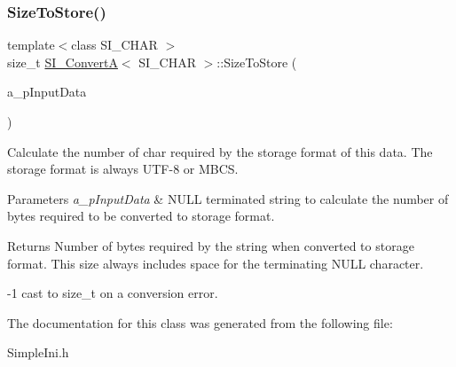 \subsubsection{\texorpdfstring{Size\+To\+Store()}{SizeToStore()}}
{\footnotesize\ttfamily template$<$class S\+I\+\_\+\+C\+H\+AR $>$ \\
size\+\_\+t \hyperlink{a00925}{S\+I\+\_\+\+ConvertA}$<$ S\+I\+\_\+\+C\+H\+AR $>$\+::Size\+To\+Store (\begin{DoxyParamCaption}\item[{const S\+I\+\_\+\+C\+H\+AR $\ast$}]{a\+\_\+p\+Input\+Data }\end{DoxyParamCaption})\hspace{0.3cm}{\ttfamily [inline]}}

Calculate the number of char required by the storage format of this data. The storage format is always U\+T\+F-\/8 or M\+B\+CS.


\begin{DoxyParams}{Parameters}
{\em a\+\_\+p\+Input\+Data} & N\+U\+LL terminated string to calculate the number of bytes required to be converted to storage format. \\
\hline
\end{DoxyParams}
\begin{DoxyReturn}{Returns}
Number of bytes required by the string when converted to storage format. This size always includes space for the terminating N\+U\+LL character. 

-\/1 cast to size\+\_\+t on a conversion error. 
\end{DoxyReturn}


The documentation for this class was generated from the following file\+:\begin{DoxyCompactItemize}
\item 
Simple\+Ini.\+h\end{DoxyCompactItemize}
